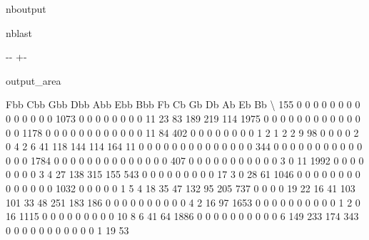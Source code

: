 \documentclass[letterpaper,10pt,english]{sphinxmanual}
\newlength\nbsphinxcodecellspacing
\begin{document}
\begin{sphinxuseclass}{nboutput}
\begin{sphinxuseclass}{nblast}
{

\kern-\sphinxverbatimsmallskipamount\kern-\baselineskip
\kern+\FrameHeightAdjust\kern-\fboxrule
\vspace{\nbsphinxcodecellspacing}

\begin{sphinxuseclass}{output_area}
\begin{sphinxuseclass}{}


\begin{sphinxVerbatim}[commandchars=\\\{\}]
\llap{\color{nbsphinxout}[9]:\,\hspace{\fboxrule}\hspace{\fboxsep}}      Fbb  Cbb  Gbb  Dbb  Abb  Ebb  Bbb  Fb   Cb   Gb   Db   Ab   Eb   Bb  \textbackslash{}
155     0    0    0    0    0    0    0   0    0    0    0    0    0    0
1073    0    0    0    0    0    0    0   0   11   23   83  189  219  114
1975    0    0    0    0    0    0    0   0    0    0    0    0    0    0
1178    0    0    0    0    0    0    0   0    0    0    0    0   11   84
402     0    0    0    0    0    0    0   0    1    2    1    2    2    9
98      0    0    0    0    2    0    4   2    6   41  118  144  114  164
11      0    0    0    0    0    0    0   0    0    0    0    0    0    0
344     0    0    0    0    0    0    0   0    0    0    0    0    0    0
1784    0    0    0    0    0    0    0   0    0    0    0    0    0    0
407     0    0    0    0    0    0    0   0    0    0    0    3    0   11
1992    0    0    0    0    0    0    0   0    3    4   27  138  315  155
543     0    0    0    0    0    0    0   0    0   17    3    0   28   61
1046    0    0    0    0    0    0    0   0    0    0    0    0    0    0
1032    0    0    0    0    0    1    5   4   18   35   47  132   95  205
737     0    0    0    0   19   22   16  41  103  101   33   48  251  183
186     0    0    0    0    0    0    0   0    0    0    4    2   16   97
1653    0    0    0    0    0    0    0   0    0    0    1    2    0   16
1115    0    0    0    0    0    0    0   0    0   10    8    6   41   64
1886    0    0    0    0    0    0    0   0    0    0    6  149  233  174
343     0    0    0    0    0    0    0   0    0    0    0    1   19   53


\end{sphinxVerbatim}
\end{sphinxuseclass}
\end{sphinxuseclass}}
\end{sphinxuseclass}
\end{sphinxuseclass}
\end{document}
